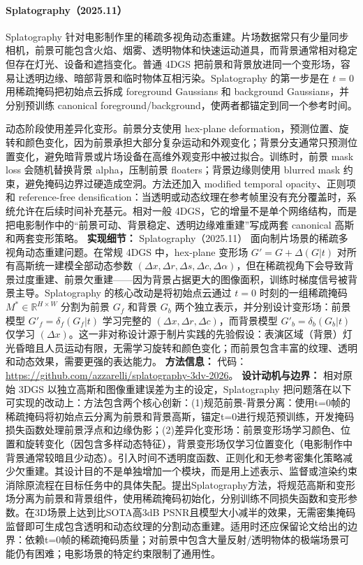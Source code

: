 \paragraph{Splatography（2025.11）\cite{2511_05152}}
Splatography 针对电影制作里的稀疏多视角动态重建。片场数据常只有少量同步相机，前景可能包含火焰、烟雾、透明物体和快速运动道具，而背景通常相对稳定但存在灯光、设备和遮挡变化。普通 4DGS 把前景和背景放进同一个变形场，容易让透明边缘、暗部背景和临时物体互相污染。Splatography 的第一步是在 $t=0$ 用稀疏掩码把初始点云拆成 foreground Gaussians 和 background Gaussians，并分别预训练 canonical foreground/background，使两者都锚定到同一个参考时间。

动态阶段使用差异化变形。前景分支使用 hex-plane deformation，预测位置、旋转和颜色变化，因为前景承担大部分复杂运动和外观变化；背景分支通常只预测位置变化，避免暗背景或片场设备在高维外观变形中被过拟合。训练时，前景 mask loss 会随机替换背景 alpha，压制前景 floaters；背景边缘则使用 blurred mask 约束，避免掩码边界过硬造成空洞。方法还加入 modified temporal opacity、正则项和 reference-free densification：当透明或动态纹理在参考帧里没有充分覆盖时，系统允许在后续时间补充基元。相对一般 4DGS，它的增量不是单个网络结构，而是把电影制作中的“前景可动、背景稳定、透明边缘难重建”写成两套 canonical 高斯和两套变形策略。
\textbf{实现细节：} Splatography（2025.11） 面向制片场景的稀疏多视角动态重建问题。在常规 4DGS 中，hex-plane 变形场 $G' = G + \Delta(G|t)$ 对所有高斯统一建模全部动态参数 $(\Delta x, \Delta r, \Delta s, \Delta c, \Delta\alpha)$，但在稀疏视角下会导致背景过度重建、前景欠重建——因为背景占据更大的图像面积，训练时梯度信号被背景主导。Splatography 的核心改动是将初始点云通过 $t{=}0$ 时刻的一组稀疏掩码 $M^{*} \in \mathbb{R}^{H \times W}$ 分割为前景 $G_f$ 和背景 $G_b$ 两个独立表示，并分别设计变形场：前景模型 $G'_f = \delta_f(G_f|t)$ 学习完整的 $(\Delta x, \Delta r, \Delta c)$，而背景模型 $G'_b = \delta_b(G_b|t)$ 仅学习 $(\Delta x)$。这一非对称设计源于制片实践的先验假设：表演区域（背景）灯光昏暗且人员运动有限，无需学习旋转和颜色变化；而前景包含丰富的纹理、透明和动态效果，需要更强的表达能力。
\textbf{方法信息：} 代码：\url{https://github.com/azzarelli/splatography-3dv-2026}。
\textbf{设计动机与边界：} 相对原始 3DGS 以独立高斯和图像重建误差为主的设定，Splatography 把问题落在以下可实现的改动上：方法包含两个核心创新：(1)规范前景-背景分离：使用t=0帧的稀疏掩码将初始点云分离为前景和背景高斯，锚定t=0进行规范预训练，开发掩码损失函数处理前景浮点和边缘伪影；(2)差异化变形场：前景变形场学习颜色、位置和旋转变化（因包含多样动态特征），背景变形场仅学习位置变化（电影制作中背景通常较暗且少动态）。引入时间不透明度函数、正则化和无参考密集化策略减少欠重建。其设计目的不是单独增加一个模块，而是用上述表示、监督或渲染约束消除原流程在目标任务中的具体失配。提出Splatography方法，将规范高斯和变形场分离为前景和背景组件，使用稀疏掩码初始化，分别训练不同损失函数和变形参数。在3D场景上达到比SOTA高3dB PSNR且模型大小减半的效果，无需密集掩码监督即可生成包含透明和动态纹理的分割动态重建。适用时还应保留论文给出的边界：依赖t=0帧的稀疏掩码质量；对前景中包含大量反射/透明物体的极端场景可能仍有困难；电影场景的特定约束限制了通用性。
